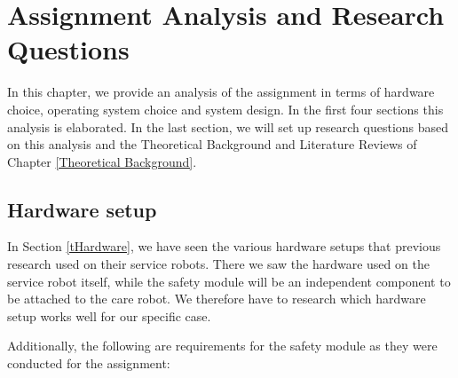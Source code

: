 \documentclass[12pt]{scrreprt}
\begin{document}
\chapter{Assignment Analysis and Research Questions}
\label{Assignment Analysis and Research Questions}
In this chapter, we provide an analysis of the assignment in terms of hardware choice, operating system choice and system design. In the first four sections this analysis is elaborated. In the last section, we will set up research questions based on this analysis and the Theoretical Background and Literature Reviews of Chapter \ref{Theoretical Background}.



\section{Hardware setup}
\label{Hardware setup}

In Section \ref{tHardware}, we have seen the various hardware setups that previous research used on their service robots. There we saw the hardware used on the service robot itself, while the safety module will be an independent component to be attached to the care robot. We therefore have to research which hardware setup works well for our specific case.
\par
Additionally, the following are requirements for the safety module as they were conducted for the assignment:
\end{document}

